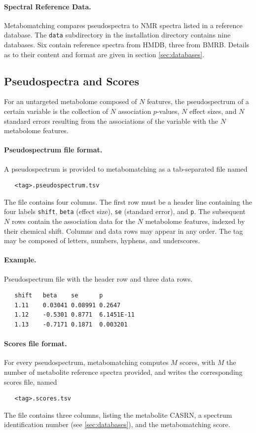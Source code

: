 \documentclass[a4paper,11pt]{article}
\begin{document}
\paragraph{Spectral Reference Data.} Metabomatching compares pseudospectra to NMR spectra listed in a reference database. The \verb|data| subdirectory in the installation directory contains nine databases. Six contain reference spectra from HMDB, three from BMRB. Details as to their content and format are given in section \ref{sec:databases}.
\subsection{Pseudospectra and Scores\label{sec:pseudospectra}}
For an untargeted metabolome composed of $N$ features, the pseudospectrum of a certain variable is the collection of $N$ association $p$-values, $N$ effect sizes, and $N$ standard errors resulting from the associations of the variable with the $N$ metabolome features.
\paragraph{Pseudospectrum file format.} A pseudospectrum is provided to metabomatching as a tab-separated file named 
\begin{verbatim}
   <tag>.pseudospectrum.tsv
\end{verbatim}
The file contains four columns. The first row must be a header line containing the four labels \verb|shift|, \verb|beta| (effect size), \verb|se| (standard error), and \verb|p|. The subsequent $N$ rows contain the association data for the $N$ metabolome features, indexed by their chemical shift. Columns and data rows may appear in any order. The tag may be composed of letters, numbers, hyphens, and underscores.
\paragraph{Example.} Pseudospectrum file with the header row and three data rows.
\begin{verbatim}
   shift   beta    se      p
   1.11    0.03041 0.08991 0.2647  
   1.12    -0.5301 0.8771  6.1451E-11
   1.13    -0.7171 0.1871  0.003201
\end{verbatim}
\paragraph{Scores file format.} For every pseudospectrum, metabomatching computes $M$ scores, with $M$ the number of metabolite reference spectra provided, and writes the corresponding scores file, named 
\begin{verbatim}
   <tag>.scores.tsv
\end{verbatim}
The file contains three columns, listing the metabolite CASRN, a spectrum identification number (see \ref{sec:databases}), and the metabomatching score.
\end{document}
